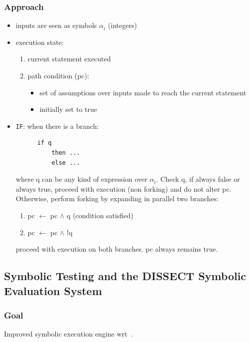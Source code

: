 \documentclass[10pt, a4paper]{article}
\begin{document}
\subsubsection{Approach}     
  \begin{itemize}   
    
    \item inputs are seen as symbols ${\alpha}_i$ (integers)
    
    \item execution state:
      \begin{enumerate}
        \item current statement executed
        \item path condition (pc): 
          \begin{itemize}
            \item set of assumptions over inputs made to reach the current statement
            \item initially set to true
          \end{itemize}
      \end{enumerate}

      \item {\tt IF}: when there is a branch: 
        \begin{lstlisting}
      if q
          then ...
          else ...
        \end{lstlisting}
        where q can be any kind of expression over ${\alpha}_i$. Check q, if always false or always true, proceed with
        execution (non forking) and do not alter pc. Otherwise, perform forking by expanding in parallel two branches:
        \begin{enumerate}
          \item pc $\gets$ pc $\wedge$ q (condition satisfied)
          \item pc $\gets$ pc $\wedge$ !q
        \end{enumerate}
        proceed with execution on both branches. pc always remains true.

  \end{itemize}

\subsection{\cite{H-TSE77} Symbolic Testing and the DISSECT Symbolic Evaluation System} 

  \subsubsection{Goal} 
  Improved symbolic execution engine wrt~\cite{K-ACM76}.
\end{document}
